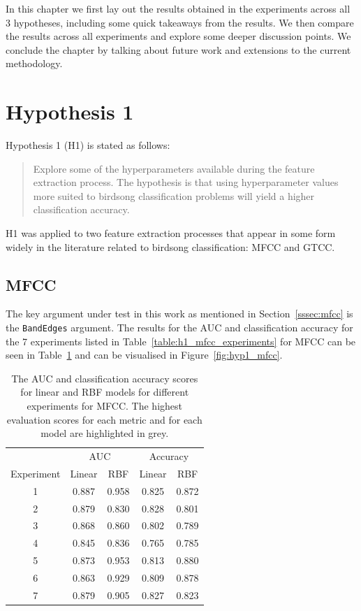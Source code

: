 In this chapter we first lay out the results obtained in the experiments across
all 3 hypotheses, including some quick takeaways from the results. We then
compare the results across all experiments and explore some deeper discussion
points. We conclude the chapter by talking about future work and extensions to
the current methodology.

\section{Hypothesis 1}

Hypothesis 1 (H1) is stated as follows:

\begin{quote}
Explore some of the hyperparameters available during the feature extraction
process. The hypothesis is that using hyperparameter values more suited to
birdsong classification problems will yield a higher classification accuracy.
\end{quote}

H1 was applied to two feature extraction processes that appear in some form
widely in the literature related to birdsong classification: MFCC and GTCC\@.

\subsection{MFCC}

The key argument under test in this work as mentioned in
Section~\ref{sssec:mfcc} is the \texttt{BandEdges} argument. The results for the
AUC and classification accuracy for the 7 experiments listed in
Table~\ref{table:h1_mfcc_experiments} for MFCC can be seen in
Table~\ref{table:hyp1_mfcc} and can be visualised in Figure~\ref{fig:hyp1_mfcc}.

\begin{table}[ht]
\begin{center}
\begin{tabular}{cc c|c c}
\toprule
& \multicolumn{2}{c|}{AUC} & \multicolumn{2}{c}{Accuracy} \\
  Experiment & Linear & RBF & Linear & RBF \\ [0.5ex]
\midrule
  1 & \cellcolor{lightgray} 0.887 & \cellcolor{lightgray} 0.958 & 0.825 & 0.872 \\
  2 & 0.879 & 0.830 & \cellcolor{lightgray} 0.828 & 0.801 \\
  3 & 0.868 & 0.860 & 0.802 & 0.789 \\
  4 & 0.845 & 0.836 & 0.765 & 0.785 \\
  5 & 0.873 & 0.953 & 0.813 & \cellcolor{lightgray} 0.880 \\
  6 & 0.863 & 0.929 & 0.809 & 0.878 \\
  7 & 0.879 & 0.905 & 0.827 & 0.823 \\
\bottomrule
\end{tabular}
\caption{The AUC and classification accuracy scores for linear and RBF models
for different experiments for MFCC\@. The highest evaluation scores for each metric
and for each model are highlighted in grey.}\label{table:hyp1_mfcc}
\end{center}
\end{table}

